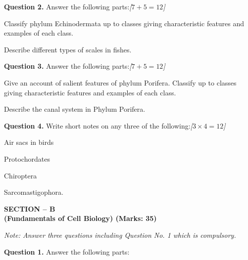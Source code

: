 \documentclass[11pt,a4paper]{article}
\newcommand{\pts}[1]{\hfill   \textit{[#1]}}
\begin{document}
\medskip


\noindent   \textbf{Question 2.} Answer the following parts:\pts{$7 + 5 = 12$}

\begin{parts}
  \item Classify phylum Echinodermata up to classes giving characteristic features and examples of each class.
  \item Describe different types of scales in fishes.
\end{parts}

\medskip


\noindent   \textbf{Question 3.} Answer the following parts:\pts{$7 + 5 = 12$}

\begin{parts}
  \item Give an account of salient features of phylum Porifera. Classify up to classes giving characteristic features and examples of each class.
  \item Describe the canal system in Phylum Porifera.
\end{parts}

\medskip


\noindent   \textbf{Question 4.} Write short notes on any three of the following:\pts{$3  \times 4 = 12$}

\begin{parts}
  \item Air sacs in birds
  \item Protochordates
  \item Chiroptera
  \item Sarcomastigophora.
\end{parts}

\pagebreak

\begin{center}
   \textbf{SECTION -- B} \\
   \textbf{(Fundamentals of Cell Biology) (Marks: 35)}
\end{center}

\smallskip



\noindent   \textit{Note: Answer three questions including Question No. 1 which is compulsory.}

\medskip


\noindent   \textbf{Question 1.} Answer the following parts:
\end{document}
